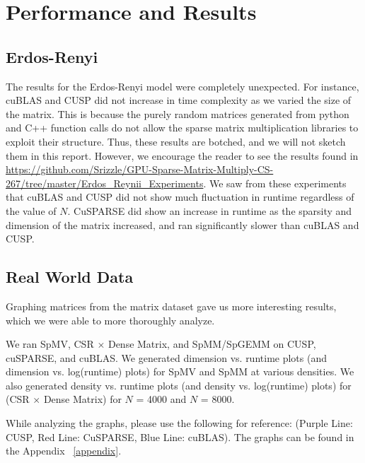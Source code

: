 \documentclass[12pt]{article}
\begin{document}
\section{Performance and Results}


\subsection{Erdos-Renyi}
\hspace{0.5cm}The results for the Erdos-Renyi model were completely unexpected. For instance, cuBLAS and CUSP did not increase in time complexity as we varied the size of the matrix. This is because the purely random matrices generated  from python and C++ function calls do not allow the sparse matrix multiplication libraries to exploit their structure. Thus, these results are botched, and we will not sketch them in this report. However, we encourage the reader to see the results found in \url{https://github.com/Srizzle/GPU-Sparse-Matrix-Multiply-CS-267/tree/master/Erdos_Reynii_Experiments}. We saw from these experiments that cuBLAS and CUSP did not show much fluctuation in runtime regardless of the value of $N$. CuSPARSE did show an increase in runtime as the sparsity and dimension of the matrix increased, and ran significantly slower than cuBLAS and CUSP. 

\subsection{Real World Data}
\hspace{0.5cm}Graphing matrices from the matrix dataset gave us more interesting results, which we were able to more thoroughly analyze.

\hspace{0.5cm}We ran  SpMV, CSR $\times$ Dense Matrix, and SpMM/SpGEMM on CUSP, cuSPARSE, and cuBLAS. We generated dimension vs. runtime plots (and dimension vs. log(runtime) plots) for SpMV and SpMM at various densities. We also generated density vs. runtime plots (and density vs. log(runtime) plots) for (CSR $\times$ Dense Matrix) for $N$ = 4000 and $N$ = 8000.

\hspace{0.5cm}While analyzing the graphs, please use the following for reference:
(Purple Line: CUSP, Red Line: CuSPARSE, Blue Line: cuBLAS). The graphs can be found in the Appendix ~\ref{appendix}.
\end{document}
